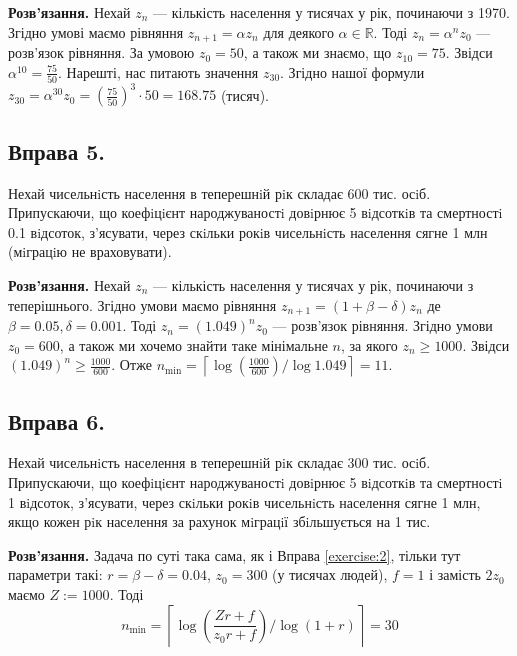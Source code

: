 \documentclass{hw_template}
\begin{document}
\textbf{Розв'язання.} Нехай $z_n$ --- кількість населення у тисячах у рік, починаючи з 1970. Згідно умові маємо рівняння $z_{n+1}=\alpha z_n$ для деякого $\alpha \in \mathbb{R}$. Тоді $z_n = \alpha^n z_0$ --- розв'язок рівняння. За умовою $z_0=50$, а також ми знаємо, що $z_{10}=75$. Звідси $\alpha^{10} = \frac{75}{50}$. Нарешті, нас питають значення $z_{30}$. Згідно нашої формули $z_{30} = \alpha^{30}z_0 = \left(\frac{75}{50}\right)^3 \cdot 50 = 168.75$ (тисяч).

\subsection{Вправа 5.}
\begin{problem}
    Нехай чисельнiсть населення в теперешнiй рiк складає 600 тис. осiб. Припускаючи, що коефiцiєнт народжуваностi довiрнює 5 вiдсоткiв та смертностi 0.1 вiдсоток, з’ясувати, через скiльки рокiв чисельнiсть населення сягне 1 млн (мiграцiю не враховувати).
\end{problem}

\textbf{Розв'язання.} Нехай $z_n$ --- кількість населення у тисячах у рік, починаючи з теперішнього. Згідно умови маємо рівняння $z_{n+1}=(1+\beta-\delta)z_n$ де $\beta=0.05,\delta=0.001$. Тоді $z_n = (1.049)^n z_0$ --- розв'язок рівняння. Згідно умови $z_0=600$, а також ми хочемо знайти таке мінімальне $n$, за якого $z_{n} \geq 1000$. Звідси $(1.049)^{n} \geq \frac{1000}{600}$. Отже $n_{\min} = \left\lceil \log\left(\frac{1000}{600}\right) \big/ \log 1.049 \right\rceil = 11$.

\subsection{Вправа 6.}
\begin{problem}
    Нехай чисельнiсть населення в теперешнiй рiк складає 300 тис. осiб. Припускаючи, що коефiцiєнт народжуваностi довiрнює 5 вiдсоткiв та смертностi 1 вiдсоток, з’ясувати, через скiльки рокiв чисельнiсть населення сягне 1 млн, якщо кожен рiк населення за рахунок мiграцiї збiльшується на 1 тис.
\end{problem}

\textbf{Розв'язання.} Задача по суті така сама, як і Вправа \ref{exercise:2}, тільки тут параметри такі: $r=\beta-\delta=0.04$, $z_0=300$ (у тисячах людей), $f=1$ і замість $2z_0$ маємо $Z:=1000$. Тоді 
\begin{equation*}
    n_{\min} = \left\lceil \log\left(\frac{Zr + f}{z_0r + f}\right) \big/ \log(1+r) \right\rceil = 30
\end{equation*}
\end{document}
